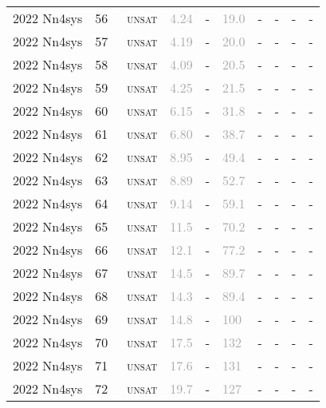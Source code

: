 \begin{center}
{\begin{longtable}{@{}llllllllll@{}}
2022 Nn4sys & 56 & ~\textsc{unsat} & \textcolor{darkgray}{4.24} & - & \textcolor{darkgray}{19.0} & - & - & - & - \\
2022 Nn4sys & 57 & ~\textsc{unsat} & \textcolor{darkgray}{4.19} & - & \textcolor{darkgray}{20.0} & - & - & - & - \\
2022 Nn4sys & 58 & ~\textsc{unsat} & \textcolor{darkgray}{4.09} & - & \textcolor{darkgray}{20.5} & - & - & - & - \\
2022 Nn4sys & 59 & ~\textsc{unsat} & \textcolor{darkgray}{4.25} & - & \textcolor{darkgray}{21.5} & - & - & - & - \\
2022 Nn4sys & 60 & ~\textsc{unsat} & \textcolor{darkgray}{6.15} & - & \textcolor{darkgray}{31.8} & - & - & - & - \\
2022 Nn4sys & 61 & ~\textsc{unsat} & \textcolor{darkgray}{6.80} & - & \textcolor{darkgray}{38.7} & - & - & - & - \\
2022 Nn4sys & 62 & ~\textsc{unsat} & \textcolor{darkgray}{8.95} & - & \textcolor{darkgray}{49.4} & - & - & - & - \\
2022 Nn4sys & 63 & ~\textsc{unsat} & \textcolor{darkgray}{8.89} & - & \textcolor{darkgray}{52.7} & - & - & - & - \\
2022 Nn4sys & 64 & ~\textsc{unsat} & \textcolor{darkgray}{9.14} & - & \textcolor{darkgray}{59.1} & - & - & - & - \\
2022 Nn4sys & 65 & ~\textsc{unsat} & \textcolor{darkgray}{11.5} & - & \textcolor{darkgray}{70.2} & - & - & - & - \\
2022 Nn4sys & 66 & ~\textsc{unsat} & \textcolor{darkgray}{12.1} & - & \textcolor{darkgray}{77.2} & - & - & - & - \\
2022 Nn4sys & 67 & ~\textsc{unsat} & \textcolor{darkgray}{14.5} & - & \textcolor{darkgray}{89.7} & - & - & - & - \\
2022 Nn4sys & 68 & ~\textsc{unsat} & \textcolor{darkgray}{14.3} & - & \textcolor{darkgray}{89.4} & - & - & - & - \\
2022 Nn4sys & 69 & ~\textsc{unsat} & \textcolor{darkgray}{14.8} & - & \textcolor{darkgray}{100} & - & - & - & - \\
2022 Nn4sys & 70 & ~\textsc{unsat} & \textcolor{darkgray}{17.5} & - & \textcolor{darkgray}{132} & - & - & - & - \\
2022 Nn4sys & 71 & ~\textsc{unsat} & \textcolor{darkgray}{17.6} & - & \textcolor{darkgray}{131} & - & - & - & - \\
2022 Nn4sys & 72 & ~\textsc{unsat} & \textcolor{darkgray}{19.7} & - & \textcolor{darkgray}{127} & - & - & - & - \\

\end{longtable}}
\end{center}
